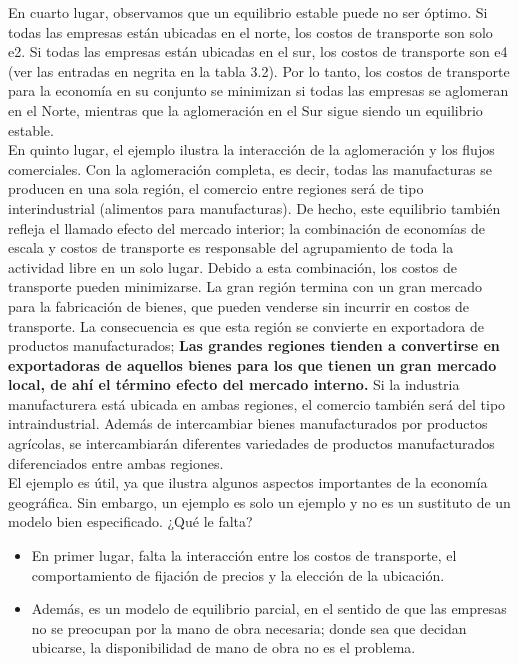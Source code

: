 En cuarto lugar, observamos que un equilibrio estable puede no ser óptimo. Si todas las empresas están ubicadas en el norte, los costos de transporte son solo e2. Si todas las empresas están ubicadas en el sur, los costos de transporte son e4 (ver las entradas en negrita en la tabla 3.2). Por lo tanto, los costos de transporte para la economía en su conjunto se minimizan si todas las empresas se aglomeran en el Norte, mientras que la aglomeración en el Sur sigue siendo un equilibrio estable.\\
En quinto lugar, el ejemplo ilustra la interacción de la aglomeración y los flujos comerciales. Con la aglomeración completa, es decir, todas las manufacturas se producen en una sola región, el comercio entre regiones será de tipo interindustrial (alimentos para manufacturas). De hecho, este equilibrio también refleja el llamado efecto del mercado interior; la combinación de economías de escala y costos de transporte es responsable del agrupamiento de toda la actividad libre en un solo lugar. Debido a esta combinación, los costos de transporte pueden minimizarse. La gran región termina con un gran mercado para la fabricación de bienes, que pueden venderse sin incurrir en costos de transporte. La consecuencia es que esta región se convierte en exportadora de productos manufacturados; \textbf{Las grandes regiones tienden a convertirse en exportadoras de aquellos bienes para los que tienen un gran mercado local, de ahí el término efecto del mercado interno.} Si la industria manufacturera está ubicada en ambas regiones, el comercio también será del tipo intraindustrial. Además de intercambiar bienes manufacturados por productos agrícolas, se intercambiarán diferentes variedades de productos manufacturados diferenciados entre ambas regiones.\\
El ejemplo es útil, ya que ilustra algunos aspectos importantes de la economía geográfica. Sin embargo, un ejemplo es solo un ejemplo y no es un sustituto de un modelo bien especificado. ¿Qué le falta?
\begin{itemize}
    \item En primer lugar, falta la interacción entre los costos de transporte, el comportamiento de fijación de precios y la elección de la ubicación. 
    \item Además, es un modelo de equilibrio parcial, en el sentido de que las empresas no se preocupan por la mano de obra necesaria; donde sea que decidan ubicarse, la disponibilidad de mano de obra no es el problema. 
\end{itemize}

